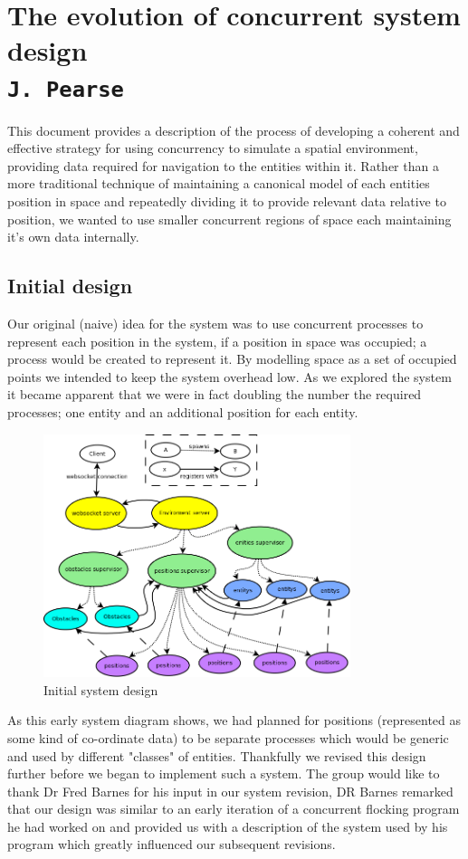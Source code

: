 \pagestyle{empty}

\section{The evolution of concurrent system design\\{\small\tt{J.~Pearse}}}
\label{system_evolution}
This document provides a description of the process of developing a coherent and effective strategy for using concurrency to simulate a spatial environment, providing data required for navigation to the entities within it.
Rather than a more traditional technique of maintaining a canonical model of each entities position in space and repeatedly dividing it to provide relevant data relative to position, we wanted to use smaller concurrent regions of space each maintaining it's own data internally.
\subsection{Initial design}
Our original (naive) idea for the system was to use concurrent processes to represent each position in the system, if a position in space was occupied; a process would be created to represent it. By modelling space as a set of occupied points we intended to keep the system overhead low. As we explored the system it became apparent that we were in fact doubling the number the required processes; one entity and an additional position for each entity.
\begin{figure}[h]
  \centering
  \includegraphics[width=0.8\textwidth]{img/HighLevelProcess.png}
\caption{Initial system design}
    \label{fig:Initial system design}
\end{figure}
As this early system diagram shows, we had planned for positions (represented as some kind of co-ordinate data) to be separate processes which would be generic and used by different "classes" of entities. Thankfully we revised this design further before we began to implement such a system.
The group would like to thank Dr Fred Barnes for his input in our system revision, DR Barnes remarked that our design was similar to an early iteration of a concurrent flocking program he had worked on and provided us with a description of the system used by his program which greatly influenced our subsequent revisions.

